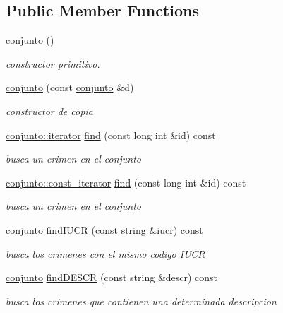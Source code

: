 \subsection*{Public Member Functions}
\begin{DoxyCompactItemize}
\item 
\hyperlink{classconjunto_a16d987f42c679efab01748178ba45891}{conjunto} ()
\begin{DoxyCompactList}\small\item\em constructor primitivo. \end{DoxyCompactList}\item 
\hyperlink{classconjunto_ab0944b1f9a0c959ca314ce0debd5def9}{conjunto} (const \hyperlink{classconjunto}{conjunto} \&d)
\begin{DoxyCompactList}\small\item\em constructor de copia \end{DoxyCompactList}\item 
\hyperlink{classconjunto_1_1iterator}{conjunto\-::iterator} \hyperlink{classconjunto_a2459d07b15a25a474f1be8dc0038feb5}{find} (const long int \&id) const 
\begin{DoxyCompactList}\small\item\em busca un crimen en el conjunto \end{DoxyCompactList}\item 
\hyperlink{classconjunto_1_1const__iterator}{conjunto\-::const\-\_\-iterator} \hyperlink{classconjunto_a356285fe75238fd67673eba9c6bf6d24}{find} (const long int \&id) const 
\begin{DoxyCompactList}\small\item\em busca un crimen en el conjunto \end{DoxyCompactList}\item 
\hyperlink{classconjunto}{conjunto} \hyperlink{classconjunto_a2ca2a7b59bce8369e9d9ccc1c7be9614}{find\-I\-U\-C\-R} (const string \&iucr) const 
\begin{DoxyCompactList}\small\item\em busca los crimenes con el mismo codigo I\-U\-C\-R \end{DoxyCompactList}\item 
\hyperlink{classconjunto}{conjunto} \hyperlink{classconjunto_afff3e7f4b3d00f422dd7ab2fec935378}{find\-D\-E\-S\-C\-R} (const string \&descr) const 
\begin{DoxyCompactList}\small\item\em busca los crimenes que contienen una determinada descripcion \end{DoxyCompactList}\item 

\end{DoxyCompactItemize}
